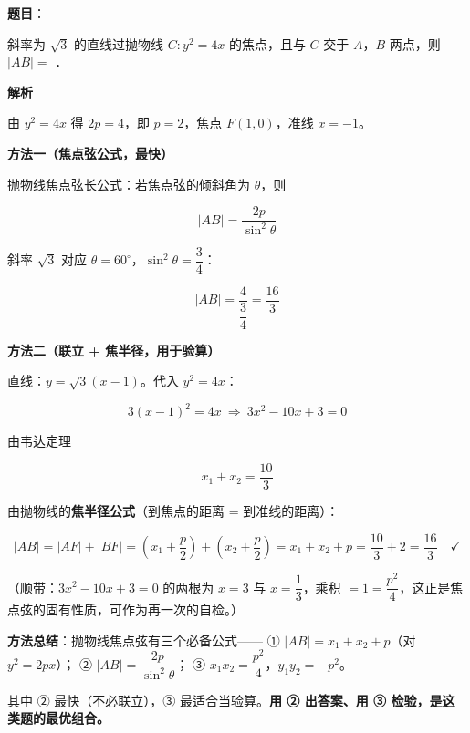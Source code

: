 \begin{answer}

\textbf{题目}：

斜率为 $\sqrt3$ 的直线过抛物线 $C:y^{2}=4x$ 的焦点，且与 $C$ 交于 $A$，$B$ 两点，则 $|AB|=$ \gkblank{}．

\textbf{解析}

由 $y^{2}=4x$ 得 $2p=4$，即 $p=2$，焦点 $F(1,0)$，准线 $x=-1$。

\textbf{方法一（焦点弦公式，最快）}

抛物线焦点弦长公式：若焦点弦的倾斜角为 $\theta$，则

\nopagebreak[4]
\[|AB|=\frac{2p}{\sin^{2}\theta}\]

斜率 $\sqrt3$ 对应 $\theta=60^\circ$，$\sin^{2}\theta=\dfrac34$：

\nopagebreak[4]
\[|AB|=\frac{4}{\dfrac34}=\frac{16}3\]

\textbf{方法二（联立 + 焦半径，用于验算）}

直线：$y=\sqrt3(x-1)$。代入 $y^{2}=4x$：

\nopagebreak[4]
\[3(x-1)^{2}=4x\ \Longrightarrow\ 3x^{2}-10x+3=0\]

由韦达定理

\nopagebreak[4]
\[x_1+x_2=\frac{10}3\]

由抛物线的\textbf{焦半径公式}（到焦点的距离 = 到准线的距离）：

\nopagebreak[4]
\[|AB|=|AF|+|BF|=\left(x_1+\frac p2\right)+\left(x_2+\frac p2\right)=x_1+x_2+p=\frac{10}3+2=\frac{16}3\quad\checkmark\]

（顺带：$3x^{2}-10x+3=0$ 的两根为 $x=3$ 与 $x=\dfrac13$，乘积 $=1=\dfrac{p^{2}}4$，这正是焦点弦的固有性质，可作为再一次的自检。）

\begin{gktip}
\textbf{方法总结}：抛物线焦点弦有三个必备公式——
① $|AB|=x_1+x_2+p$（对 $y^{2}=2px$）；
② $|AB|=\dfrac{2p}{\sin^{2}\theta}$；
③ $x_1x_2=\dfrac{p^{2}}4$，$y_1y_2=-p^{2}$。

其中 ② 最快（不必联立），③ 最适合当验算。\textbf{用 ② 出答案、用 ③ 检验，是这类题的最优组合。}
\end{gktip}


\par\medskip

\end{answer}
